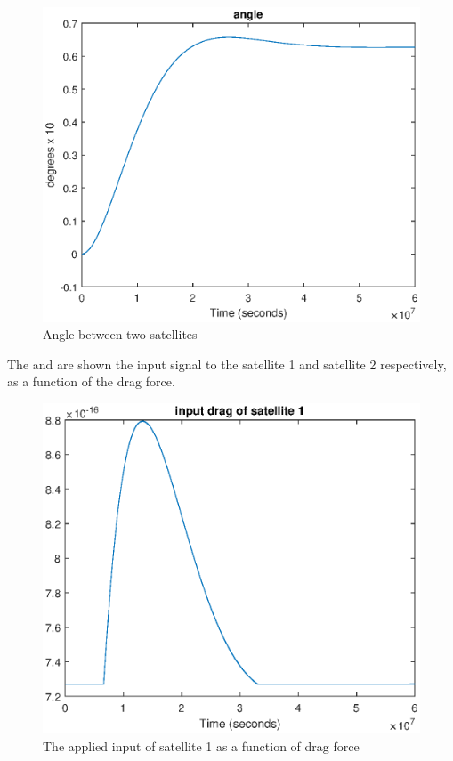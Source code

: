\begin{figure}[H]
	\centering
	\includegraphics[width=0.9\linewidth]
	{figures/distance_contro_angle.eps}
	\caption{Angle between two satellites }
	\label{fig:distancecontrol2}
\end{figure}
%
The  and  are shown the input signal to the satellite 1 and satellite 2 respectively, as a function of the drag force. 
%
\begin{figure}[H]
	\centering
	\includegraphics[width=0.9\linewidth]
	{figures/input_drag_sat1.eps}
	\caption{The applied input of satellite 1 as a function of drag force  }
	\label{fig:distancecontrol3}
\end{figure}
